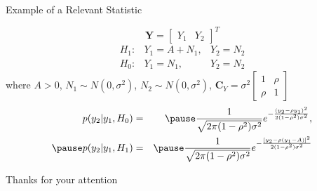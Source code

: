 \documentclass[t]{beamer}
\begin{document}
\begin{frame}{Example of a Relevant Statistic}
  \footnotesize
  \begin{example}
    \begin{equation*}
      \mathbf{Y} = \begin{bmatrix} Y_1 & Y_2 \end{bmatrix}^T
    \end{equation*}
    \pause
    \begin{equation*}
      \begin{array}{lll}
        H_1 : & Y_1 = A+N_1,& Y_2 = N_2 \\
        H_0 : & Y_1 = N_1,& Y_2 = N_2 
      \end{array}
    \end{equation*}
    where $A >0$, $N_1 \sim N(0,\sigma^2)$, $N_2 \sim N(0,\sigma^2)$, \pause $\mathbf{C}_Y = \sigma^2 \begin{bmatrix} 1 & \rho \\ \rho & 1 \end{bmatrix}$
    \pause
    \begin{eqnarray*}
      p(y_2|y_1,H_0) & = & \pause \frac{1}{\sqrt{2\pi(1-\rho^2) \sigma^2}} e^{-\frac{(y_2-\rho y_1)^2}{2(1-\rho^2)\sigma^2}},\\ 
      \pause
      p(y_2|y_1,H_1) & = & \pause \frac{1}{\sqrt{2\pi(1-\rho^2) \sigma^2}} e^{-\frac{[y_2-\rho (y_1-A)]^2}{2(1-\rho^2)\sigma^2}}
    \end{eqnarray*}
  \end{example}
  \normalsize
\end{frame}

\begin{frame}{}
\vfill
\begin{center}
Thanks for your attention
\end{center}
\vfill
\end{frame}
\end{document}
